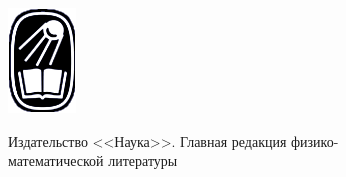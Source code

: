 \begin{minipage}[t][][t]{0.45\linewidth}
\vspace{0.3cm}
\begin{minipage}[l]{0.1\linewidth}
\includegraphics[width=\linewidth]{nauka}
\end{minipage}%
\hspace{3dd}%
\begin{minipage}[с]{0.87\linewidth}
\fontsize{8dd}{6dd}\selectfont
\raggedright
Издательство <<Наука>>. Главная редакция физико-\\математической литературы
\end{minipage}
\end{minipage}%
